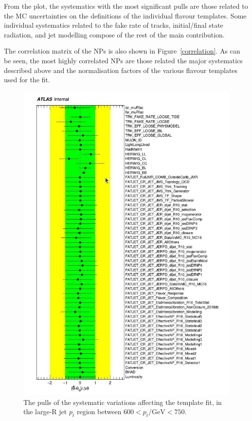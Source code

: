 \documentclass[10pt,a4paper]{book}
\begin{document}
From the plot, the systematics with the most significant pulls are those related to the MC uncertainties on the definitions of the individual flavour templates. Some individual systematics related to the fake rate of tracks, initial/final state radiation, and jet modelling compose of the rest of the main contribution.

The correlation matrix of the NPs is also shown in Figure~\ref{correlation}. As can be seen, the most highly correlated NPs are those related the major systematics described above and the normalisation factors of the various flavour templates used for the fit. 

\begin{figure}
    \centering
    \includegraphics[width=0.8\linewidth]{ftag/pulls_smooth.png}
    \caption{The pulls of the systematic variations affecting the template fit, in the large-R jet $p_t$ region between $600 < p_t/\text{GeV} < 750$.}
    \label{fig:pulls}
\end{figure}
\end{document}
